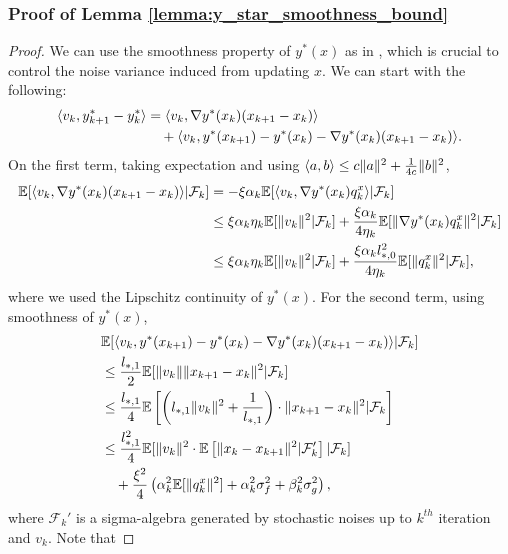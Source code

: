 \subsubsection{Proof of Lemma \ref{lemma:y_star_smoothness_bound}}
\label{appendix:proof:y_star_smoothness_bound}
\begin{proof}
    We can use the smoothness property of $y^*(x)$ as in \cite{chen2021closing}, which is crucial to control the noise variance induced from updating $x$. We can start with the following:
    \begin{align*}
        \langle v_k, y_{k+1}^* - y_k^* \rangle &= \langle v_k, \nabla y^*(x_k) (x_{k+1} - x_k) \rangle \\
        &\quad + \langle v_k, y^*(x_{k+1}) - y^*(x_k) - \nabla y^*(x_k) (x_{k+1} - x_k) \rangle.
    \end{align*}
    On the first term, taking expectation and using $\langle a, b \rangle \le c \|a\|^2 + \frac{1}{4c} \|b\|^2$,
    \begin{align*}
        \mathbb{E}[\langle v_k, \nabla y^*(x_k) (x_{k+1} - x_k) \rangle | \mathcal{F}_k] &= -\xi\alpha_k \mathbb{E}[\langle v_k, \nabla y^*(x_k) q_k^x  \rangle | \mathcal{F}_k] \\
        &\le \xi\alpha_k \eta_k \mathbb{E}[\|v_k\|^2 | \mathcal{F}_k] + \frac{\xi \alpha_k}{4\eta_k} \mathbb{E}[\|\nabla y^*(x_k) q_k^x\|^2 | \mathcal{F}_k] \\
        &\le \xi \alpha_k \eta_k \mathbb{E}[\|v_k\|^2| \mathcal{F}_k] + \frac{\xi\alpha_k l_{*,0}^2}{4\eta_k} \mathbb{E}[\|q_k^x\|^2 | \mathcal{F}_k],
    \end{align*}
    where we used the Lipschitz continuity of $y^*(x)$. For the second term, using smoothness of $y^*(x)$, 
    \begin{align*}
        & \mathbb{E}[\langle v_k, y^*(x_{k+1}) - y^*(x_k) - \nabla y^*(x_k) (x_{k+1} - x_k) \rangle | \mathcal{F}_k] \\
        &\le \frac{l_{*,1}}{2} \mathbb{E}[ \|v_k\| \|x_{k+1}-x_k\|^2 | \mathcal{F}_k] \\
        &\le \frac{l_{*,1}}{4} \mathbb{E}\left[ \left(l_{*,1} \|v_k\|^2 + \frac{1}{l_{*,1}} \right) \cdot \|x_{k+1}-x_k\|^2 | \mathcal{F}_k \right] \\
        &\le \frac{l_{*,1}^2 }{4} \mathbb{E}[\|v_k\|^2 \cdot \mathbb{E}\left[\|x_{k} - x_{k+1}\|^2 | \mathcal{F}_{k}' \right] | \mathcal{F}_k] \\
        &\quad + \frac{\xi^2}{4} \left(\alpha_k^2 \mathbb{E}[\|q_k^x\|^2]  + \alpha_k^2 \sigma_f^2 + \beta_k^2 \sigma_g^2 \right),
    \end{align*}
    where $\mathcal{F}_k'$ is a sigma-algebra generated by stochastic noises up to $k^{th}$ iteration and $v_k$. Note that 

\end{proof}
